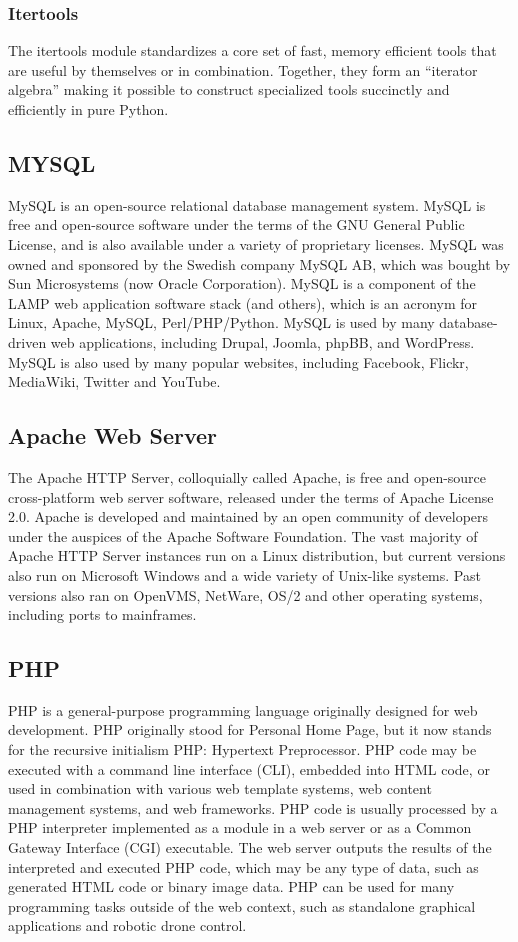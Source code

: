 \documentclass[12pt]{article}
\begin{document}
\subsubsection{Itertools}
The itertools module standardizes a core set of fast, memory efficient tools that are useful by themselves or in combination. Together, they form an “iterator algebra” making it possible to construct specialized tools succinctly and efficiently in pure Python.\cite{itertools}

\subsection{MYSQL}
MySQL is an open-source relational database management system. MySQL is free and open-source software under the terms of the GNU General Public License, and is also available under a variety of proprietary licenses. MySQL was owned and sponsored by the Swedish company MySQL AB, which was bought by Sun Microsystems (now Oracle Corporation). MySQL is a component of the LAMP web application software stack (and others), which is an acronym for Linux, Apache, MySQL, Perl/PHP/Python. MySQL is used by many database-driven web applications, including Drupal, Joomla, phpBB, and WordPress. MySQL is also used by many popular websites, including Facebook, Flickr, MediaWiki, Twitter and YouTube.\cite{mysql}

\subsection{Apache Web Server}
The Apache HTTP Server, colloquially called Apache, is free and open-source cross-platform web server software, released under the terms of Apache License 2.0. Apache is developed and maintained by an open community of developers under the auspices of the Apache Software Foundation. The vast majority of Apache HTTP Server instances run on a Linux distribution, but current versions also run on Microsoft Windows and a wide variety of Unix-like systems. Past versions also ran on OpenVMS, NetWare, OS/2 and other operating systems, including ports to mainframes.\cite{apache}

\subsection{PHP}
PHP is a general-purpose programming language originally designed for web development. PHP originally stood for Personal Home Page,
but it now stands for the recursive initialism PHP: Hypertext Preprocessor. PHP code may be executed with a command line interface (CLI), embedded into HTML code, or used in combination with various web template systems, web content management systems, and web frameworks. PHP code is usually processed by a PHP interpreter implemented as a module in a web server or as a Common Gateway Interface (CGI) executable. The web server outputs the results of the interpreted and executed PHP code, which may be any type of data, such as generated HTML code or binary image data. PHP can be used for many programming tasks outside of the web context, such as standalone graphical applications and robotic drone control.\cite{php}
\end{document}
